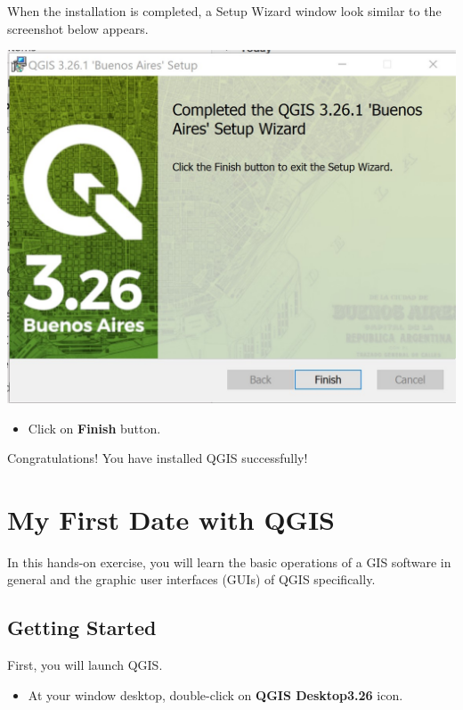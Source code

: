 \documentclass[
  letterpaper,
  DIV=11,
  numbers=noendperiod]{scrreprt}
\providecommand{\tightlist}{%
  \setlength{\itemsep}{0pt}\setlength{\parskip}{0pt}}\usepackage{longtable,booktabs,array}
\begin{document}
When the installation is completed, a Setup Wizard window look similar
to the screenshot below appears.

\includegraphics{./img/image10.jpg}

\begin{itemize}
\tightlist
\item
  Click on \textbf{Finish} button.
\end{itemize}

Congratulations! You have installed QGIS successfully!


\hypertarget{my-first-date-with-qgis}{%
\chapter{My First Date with QGIS}\label{my-first-date-with-qgis}}

In this hands-on exercise, you will learn the basic operations of a GIS
software in general and the graphic user interfaces (GUIs) of QGIS
specifically.

\hypertarget{getting-started}{%
\section{Getting Started}\label{getting-started}}

First, you will launch QGIS.

\begin{itemize}
\tightlist
\item
  At your window desktop, double-click on \textbf{QGIS Desktop3.26}
  icon.
\end{itemize}
\end{document}
